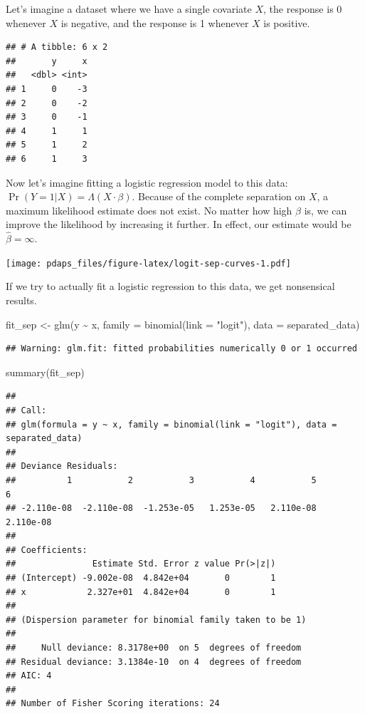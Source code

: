 \documentclass[
  12pt,
  oneside,openany]{book}
\newenvironment{Shaded}{\begin{snugshade}}{\end{snugshade}}
\newcommand{\AttributeTok}[1]{\textcolor[rgb]{0.77,0.63,0.00}{#1}}
\newcommand{\FunctionTok}[1]{\textcolor[rgb]{0.00,0.00,0.00}{#1}}
\newcommand{\NormalTok}[1]{#1}
\newcommand{\OtherTok}[1]{\textcolor[rgb]{0.56,0.35,0.01}{#1}}
\newcommand{\SpecialCharTok}[1]{\textcolor[rgb]{0.00,0.00,0.00}{#1}}
\newcommand{\StringTok}[1]{\textcolor[rgb]{0.31,0.60,0.02}{#1}}
\begin{document}
Let's imagine a dataset where we have a single covariate \(X\), the response is 0 whenever \(X\) is negative, and the response is 1 whenever \(X\) is positive.

\begin{verbatim}
## # A tibble: 6 x 2
##       y     x
##   <dbl> <int>
## 1     0    -3
## 2     0    -2
## 3     0    -1
## 4     1     1
## 5     1     2
## 6     1     3
\end{verbatim}

Now let's imagine fitting a logistic regression model to this data: \(\Pr(Y = 1 | X) = \Lambda(X \cdot \beta)\).
Because of the complete separation on \(X\), a maximum likelihood estimate does not exist.
No matter how high \(\beta\) is, we can improve the likelihood by increasing it further.
In effect, our estimate would be \(\hat{\beta} = \infty\).

\texttt{[image: pdaps\_files/figure-latex/logit-sep-curves-1.pdf]}

If we try to actually fit a logistic regression to this data, we get nonsensical results.

\begin{Shaded}
\begin{Highlighting}[]
\NormalTok{fit\_sep }\OtherTok{\textless{}{-}} \FunctionTok{glm}\NormalTok{(y }\SpecialCharTok{\textasciitilde{}}\NormalTok{ x,}
               \AttributeTok{family =} \FunctionTok{binomial}\NormalTok{(}\AttributeTok{link =} \StringTok{"logit"}\NormalTok{),}
               \AttributeTok{data =}\NormalTok{ separated\_data)}
\end{Highlighting}
\end{Shaded}

\begin{verbatim}
## Warning: glm.fit: fitted probabilities numerically 0 or 1 occurred
\end{verbatim}

\begin{Shaded}
\begin{Highlighting}[]
\FunctionTok{summary}\NormalTok{(fit\_sep)}
\end{Highlighting}
\end{Shaded}

\begin{verbatim}
## 
## Call:
## glm(formula = y ~ x, family = binomial(link = "logit"), data = separated_data)
## 
## Deviance Residuals: 
##          1           2           3           4           5           6  
## -2.110e-08  -2.110e-08  -1.253e-05   1.253e-05   2.110e-08   2.110e-08  
## 
## Coefficients:
##               Estimate Std. Error z value Pr(>|z|)
## (Intercept) -9.002e-08  4.842e+04       0        1
## x            2.327e+01  4.842e+04       0        1
## 
## (Dispersion parameter for binomial family taken to be 1)
## 
##     Null deviance: 8.3178e+00  on 5  degrees of freedom
## Residual deviance: 3.1384e-10  on 4  degrees of freedom
## AIC: 4
## 
## Number of Fisher Scoring iterations: 24
\end{verbatim}
\end{document}
